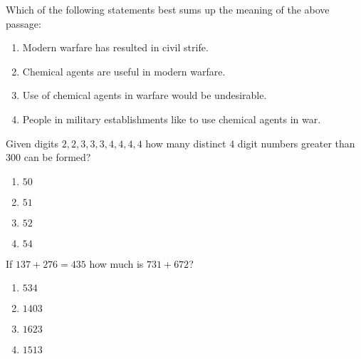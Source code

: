     Which of the following statements best sums up the meaning of the above passage:
    \begin{enumerate}
        \item Modern warfare has resulted in civil strife.
        \item Chemical agents are useful in modern warfare.
        \item Use of chemical agents in warfare would be undesirable.
        \item People in military establishments like to use chemical agents in war.
    \end{enumerate}
    \item Given digits $2, 2, 3, 3, 3, 4, 4, 4, 4$ how many distinct $4$ digit numbers greater than $300$ can be formed?
    \begin{enumerate}
        \item $50$
        \item $51$
        \item $52$
        \item $54$
    \end{enumerate}
    \item If $137 + 276 = 435$ how much is $731 + 672$? 
    \begin{enumerate}
        \item $534$
        \item $1403$
        \item $1623$
        \item $1513$
    \end{enumerate} 

  


